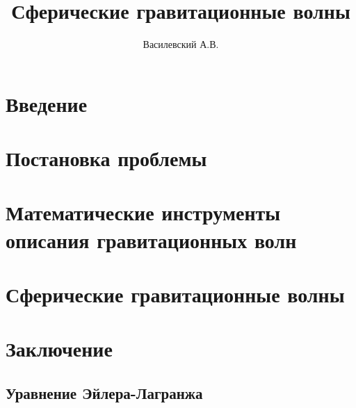 \documentclass[12pt,a4paper]{article}
\title{Сферические гравитационные волны}
\author{Василевский А.В.}
\providecommand{\docroot}{../..}
\begin{document}
    \makedocroot

    \maketitle
    \tableofcontents

    \section{Введение}
    

    \section{Постановка проблемы}
    

    \section{Математические инструменты описания гравитационных волн}
    

    \section{Сферические гравитационные волны}
    

    \section{Заключение}
    

    \begin{appendix}

        \section{Уравнение Эйлера-Лагранжа}
        

    \end{appendix}

    \todototoc\listoftodos

    \clearpage

    
    
\end{document}
